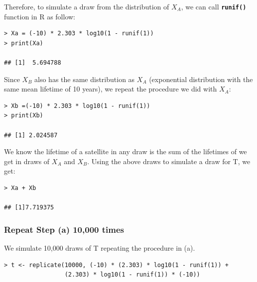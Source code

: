 \documentclass[12pt,letterpaper,titlepage,en-US]{article}
\begin{document}
Therefore, to simulate a draw from the distribution of $X_{A}$, we can call \texttt{\textbf{runif()}} function in R as follow:

\begin{knitrout}
\color{fgcolor}
\begin{kframe}

\begin{verbatim}
> Xa = (-10) * 2.303 * log10(1 - runif(1)) 
> print(Xa)

## [1]  5.694788
\end{verbatim}
\end{kframe}
\end{knitrout}

Since $X_{B}$ also has the same distribution as $X_{A}$ (exponential distribution with the same mean lifetime of 10 years), we repeat the procedure we did with $X_{A}$:

\begin{knitrout}
\color{fgcolor}
\begin{kframe}

\begin{verbatim}
> Xb =(-10) * 2.303 * log10(1 - runif(1)) 
> print(Xb)

## [1] 2.024587
\end{verbatim}
\end{kframe}
\end{knitrout}

We know the lifetime of a satellite in any draw is the sum of the lifetimes of we get in draws of $X_{A}$ and $X_{B}$. Using the above draws to simulate a draw for T, we get:

\begin{knitrout}
\color{fgcolor}
\begin{kframe}

\begin{verbatim}
> Xa + Xb

## [1]7.719375
\end{verbatim}
\end{kframe}
\end{knitrout}


\subsubsection{Repeat Step (a) 10,000 times}
We simulate 10,000 draws of T repeating the procedure in (a). 
\begin{knitrout}
\color{fgcolor}
\begin{kframe}

\begin{verbatim}
> t <- replicate(10000, (-10) * (2.303) * log10(1 - runif(1)) +
                 (2.303) * log10(1 - runif(1)) * (-10))

\end{verbatim}
\end{kframe}
\end{knitrout}
\end{document}
